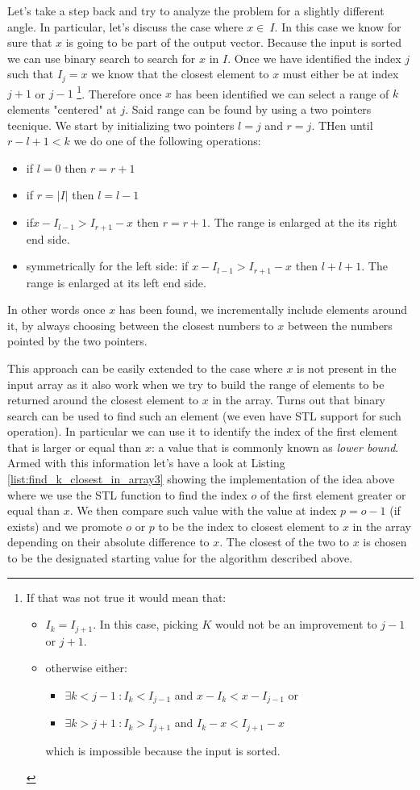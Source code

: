 Let's take a step back and try to analyze the problem for a slightly different angle. In particular,
let's discuss the case where $x \in \: I$. In this case we know for sure that $x$ is going to be
part of the output vector. Because the input is sorted we can use binary search to search for $x$ in
$I$. Once we have identified the index $j$ such that $I_j = x$ we know that the closest element to
$x$ must either be at index $j+1$ or $j-1$ \footnote{If that was not true it would mean that:
\begin{itemize}
	\item $I_k = I_{j+1}$. In this case, picking $K$  would not be an improvement to $j-1$ or $j+1$.
	\item otherwise either:
	\begin{itemize}
		\item $\exists k < j-1 \: : I_k < I_{j-1}$ and  $x-I_k < x-I_{j-1}$ or
		\item $\exists k > j+1 \: : I_k > I_{j+1}$ and  $I_k-x < I_{j+1}-x$ \end{itemize} which is
	impossible because the input is sorted. \end{itemize}}. Therefore once $x$ has been identified
	we can select a range of $k$ elements "centered" at $j$. Said range can be found by using a two
	pointers tecnique. We start by initializing two pointers $l = j$ and $r = j$. THen until $r-l+1
	< k$ we do one of the following operations:
\begin{itemize}
	\item if $l = 0$ then $r = r+1$
	\item if $r = |I|$ then $l = l-1$
	\item if$ x-I_{l-1} > I_{r+1}-x$ then $r = r+1$. The range is enlarged at the its right end
	side.
	\item symmetrically for the left side: if $x-I_{l-1} > I_{r+1}-x$ then $ l + l+1$. The range is
	enlarged at its left end side.
\end{itemize}
In other words once $x$ has been found, we incrementally include elements around it, by always
choosing between the closest numbers to $x$ between the numbers pointed by the two pointers.

This approach can be easily extended to the case where $x$ is not present in the input array as it
also work when we try to build the range of elements to be returned around the closest element to
$x$ in the array. 
Turns out that binary search can be used to find such an element (we even have STL
support for such operation). 
In particular we can use it to identify the index of the first element that is larger or equal than $x$:
a value that is commonly known as \textit{lower bound}.
Armed with this information let's have a look at Listing \ref{list:find_k_closest_in_array3} showing
the implementation of the idea above where we use the STL  function to find
the index $o$ of the first element greater or equal than $x$.
We then compare such value with the value at index $p = o-1$ (if exists)
and we promote $o$ or $p$ to be the index to closest element to $x$ in the array depending on their
absolute difference to $x$.
The closest of the two to $x$ is chosen to be the designated starting value for the algorithm described above.

